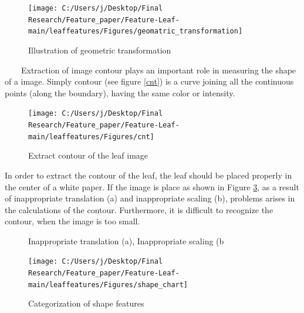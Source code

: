 \documentclass{article}
\begin{document}
\begin{figure}[!ht]

{\centering \texttt{[image: C:/Users/j/Desktop/Final Research/Feature\_paper/Feature-Leaf-main/leaffeatures/Figures/geomatric\_transformation]} 

}

\caption{\label{img3} Illustration of geometric transformation}\label{fig:unnamed-chunk-11}
\end{figure}

~~~~Extraction of image contour plays an important role in measuring the
shape of a image. Simply contour (see figure \ref{cnt}) is a curve
joining all the continuous points (along the boundary), having the same
color or intensity.

\begin{figure}[!ht]

{\centering \texttt{[image: C:/Users/j/Desktop/Final Research/Feature\_paper/Feature-Leaf-main/leaffeatures/Figures/cnt]} 

}

\caption{\label{cnt}Extract contour of the leaf image}\label{fig:unnamed-chunk-12}
\end{figure}

In order to extract the contour of the leaf, the leaf should be placed
properly in the center of a white paper. If the image is place as shown
in Figure \ref{fig:trans}, as a result of inappropriate translation (a)
and inappropriate scaling (b), problems arises in the calculations of
the contour. Furthermore, it is difficult to recognize the contour, when
the image is too small.

\begin{figure}[!ht]

{\centering {}

}

\caption{\label{trans}Inappropriate translation (a),  Inappropriate scaling (b}\label{fig:trans}
\end{figure}

\begin{figure}[!ht]

{\centering \texttt{[image: C:/Users/j/Desktop/Final Research/Feature\_paper/Feature-Leaf-main/leaffeatures/Figures/shape\_chart]} 

}

\caption{\label{scalimg4}Categorization of shape features}\label{fig:unnamed-chunk-13}
\end{figure}
\end{document}
